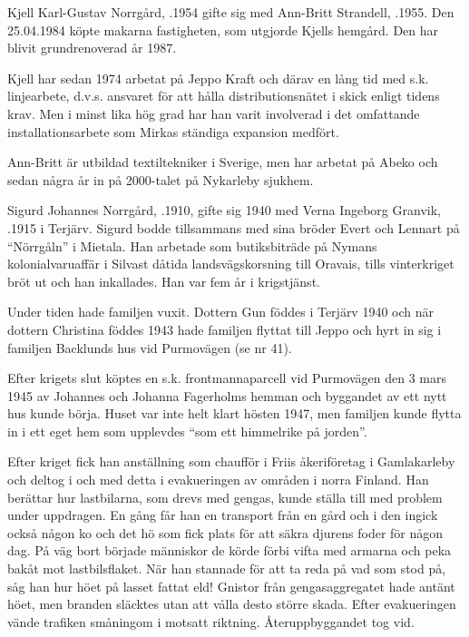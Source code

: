 


Kjell Karl-Gustav Norrgård, .1954 gifte sig  med Ann-Britt Strandell, .1955. Den 25.04.1984 köpte makarna fastigheten, som utgjorde Kjells hemgård. Den har blivit grundrenoverad år 1987.

Kjell har sedan 1974 arbetat på Jeppo Kraft och därav en lång tid med s.k. linjearbete, d.v.s. ansvaret för att hålla distributionsnätet i skick enligt tidens krav. Men i minst lika hög grad har han varit involverad i det omfattande installationsarbete som Mirkas ständiga expansion medfört.

Ann-Britt är utbildad textiltekniker i Sverige, men har arbetat på Abeko och sedan några år in på 2000-talet på Nykarleby sjukhem.
\begin{jhchildren}
  \item {}
  \item {}
\end{jhchildren}


Sigurd Johannes Norrgård, .1910, gifte sig 1940 med Verna Ingeborg Granvik, .1915 i Terjärv. Sigurd bodde tillsammans med sina bröder Evert och Lennart på ``Nörrgåln'' i Mietala. Han arbetade som butiksbiträde på Nymans kolonialvaruaffär i Silvast dåtida landsvägskorsning till Oravais, tills vinterkriget bröt ut och han inkallades. Han var fem år i krigstjänst.

Under tiden hade familjen vuxit. Dottern Gun föddes i Terjärv 1940 och när dottern Christina föddes 1943 hade familjen flyttat till Jeppo och hyrt in sig i familjen Backlunds hus vid Purmovägen (se nr 41).

Efter krigets slut köptes en s.k. frontmannaparcell vid Purmovägen den 3 mars 1945 av Johannes och Johanna Fagerholms hemman och byggandet av ett nytt hus kunde börja. Huset var inte helt klart hösten 1947, men familjen kunde flytta in i ett eget hem som upplevdes ``som ett himmelrike på jorden''.

Efter kriget fick han anställning som chaufför i Friis åkeriföretag i Gamlakarleby och deltog i och med detta i evakueringen av områden i norra Finland. Han berättar hur lastbilarna, som drevs med gengas, kunde ställa till med problem under uppdragen. En gång får han en transport från en gård och i den ingick också någon ko och det hö som fick plats för att säkra djurens foder för någon dag. På väg bort började människor de körde förbi vifta med armarna och peka bakåt mot lastbilsflaket. När han stannade för att ta reda på vad som stod på, såg han hur höet på lasset fattat eld! Gnistor från gengasaggregatet hade antänt höet, men branden släcktes utan att vålla desto större skada. Efter evakueringen vände trafiken småningom i motsatt riktning. Återuppbyggandet tog vid.


